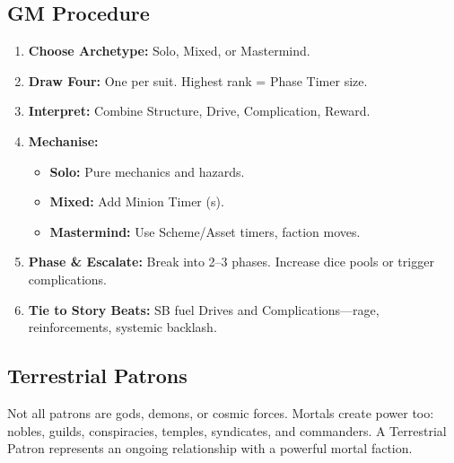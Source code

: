 \subsection{GM Procedure}
\begin{enumerate}
    \item \textbf{Choose Archetype:} Solo, Mixed, or Mastermind.
    \item \textbf{Draw Four:} One per suit. Highest rank = Phase Timer size.
    \item \textbf{Interpret:} Combine Structure, Drive, Complication, Reward.
    \item \textbf{Mechanise:}
        \begin{itemize}
            \item \textbf{Solo:} Pure mechanics and hazards.
            \item \textbf{Mixed:} Add Minion Timer (s).
            \item \textbf{Mastermind:} Use Scheme/Asset timers, faction moves.
        \end{itemize}
    \item \textbf{Phase \& Escalate:} Break into 2--3 phases. Increase dice pools or trigger complications.
    \item \textbf{Tie to Story Beats:} SB fuel Drives and Complications---rage, reinforcements, systemic backlash.
\end{enumerate}

\subsection{Terrestrial Patrons}
Not all patrons are gods, demons, or cosmic forces. Mortals create power too: nobles, guilds, conspiracies, temples, syndicates, and commanders. A Terrestrial Patron represents an ongoing relationship with a powerful mortal faction.

